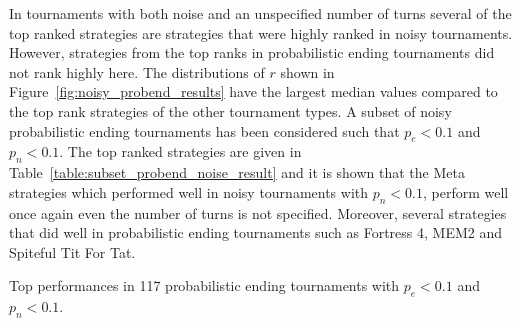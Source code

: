 \documentclass{article}
\begin{document}
In tournaments with both noise and an unspecified number of turns several of the
top ranked strategies are strategies that were highly ranked in noisy
tournaments. However, strategies from the top ranks in probabilistic ending
tournaments did not rank highly here.
The distributions of \(r\) shown in Figure~\ref{fig:noisy_probend_results} have
the largest median values compared to the top rank strategies of the other
tournament types. A subset of noisy probabilistic ending tournaments has been
considered such that \(p_e < 0.1\) and \(p_n < 0.1\). The top ranked strategies
are given in Table~\ref{table:subset_probend_noise_result} and it is shown that
the Meta strategies which performed well in noisy tournaments with \(p_n <
0.1\), perform well once again even the number of turns is not specified.
Moreover, several strategies that did well in probabilistic ending tournaments
such as Fortress 4, MEM2 and Spiteful Tit For Tat.


\begin{table}[!htbp]
    \centering
    \resizebox{.55\textwidth}{!}{
    }
    \caption{Top performances in 117 probabilistic ending tournaments with \(p_e < 0.1\) and \(p_n < 0.1\).}
    \label{table:subset_probend_noise_result}
\end{table}
\end{document}
